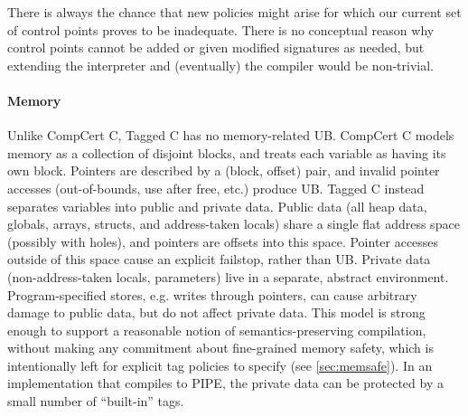 \documentclass{llncs}
\begin{document}
There is always the chance that new policies might arise for which our current set of
control points proves to be inadequate. There is no conceptual reason why
control points cannot be added or given modified signatures as needed,
but extending the interpreter and (eventually) the compiler would be non-trivial.

\paragraph{Memory} Unlike CompCert C, Tagged C has no memory-related UB.
CompCert C models memory as a collection of disjoint blocks,
and treats each variable as having its own block. Pointers are described by a (block, offset) pair,
and invalid pointer accesses (out-of-bounds, use after free, etc.) produce UB.
Tagged C instead separates variables
into public and private data. Public data (all heap data, globals, arrays, structs, and
address-taken locals) share a single flat address space (possibly with holes), and pointers are
offsets into this space. Pointer accesses outside of this space cause
an explicit failstop, rather than UB. 
Private data (non-address-taken locals, parameters) live in a separate, abstract environment.
Program-specified stores, e.g. writes through pointers, can cause arbitrary damage to public
data, but do not affect private data. 
This model is strong enough to support a reasonable
notion of semantics-preserving compilation, without making any commitment about fine-grained
memory safety, which is intentionally left for explicit tag policies to specify
(see \cref{sec:memsafe}).
In an implementation that compiles to PIPE, the private data can be protected by a small number of
``built-in'' tags.



\end{document}
